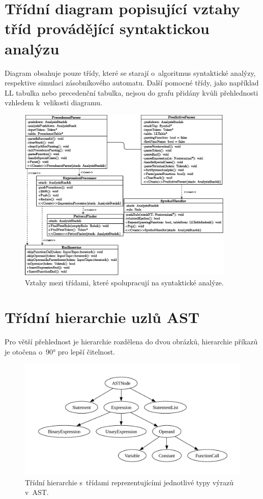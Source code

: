 \chapter{Třídní diagram popisující vztahy tříd provádějící syntaktickou analýzu}\label{kap_priloha_b}

Diagram obsahuje pouze třídy, které se starají o~algoritmus syntaktické analýzy, respektive simulaci zásobníkového automatu.
Další pomocné třídy, jako například LL tabulka nebo precedenční tabulka, nejsou do grafu přidány kvůli přehlednosti vzhledem k~velikosti diagramu.
\begin{figure}[ht]
    \centering
    \includegraphics[width=0.92\textwidth]{obrazky-figures/class_diagram.eps}
    \caption{Vztahy mezi třídami, které spolupracují na syntaktické analýze.}
\end{figure}

\chapter{Třídní hierarchie uzlů AST} \label{kap_priloha_c}
Pro větší přehlednost je hierarchie rozdělena do dvou obrázků, hierarchie příkazů je otočena o~90° pro lepší čitelnost.

\begin{figure}[h]
	\centering
	\includegraphics[width=\textwidth]{obrazky-figures/hierarchy_expression.pdf}
	\caption{Třídní hierarchie s~třídami reprezentujícími jednotlivé typy výrazů v~AST.}
	\label{fig_hierarchie_expression}
\end{figure}

